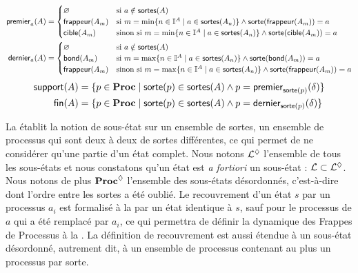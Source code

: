 \begin{definition}
  \begin{align*}
    \mathsf{premier}_{a}(A) &=
      \begin{cases}
        \varnothing & \text{si } a \notin \mathsf{sortes}(A) \\
        \mathsf{frappeur}(A_m) & \text{si } m = \min\{ n \in \mathbb{I}^{A} \mid a \in \mathsf{sortes}(A_n) \}
          \wedge \mathsf{sorte}(\mathsf{frappeur}(A_m)) = a \\
        \mathsf{cible}(A_m) & \text{sinon si } m = \min\{ n \in \mathbb{I}^{A} \mid a \in \mathsf{sortes}(A_n) \}
          \wedge \mathsf{sorte}(\mathsf{cible}(A_m)) = a
      \end{cases} \\
    \mathsf{dernier}_{a}(A) &=
      \begin{cases}
        \varnothing & \text{si } a \notin \mathsf{sortes}(A) \\
        \mathsf{bond}(A_m) & \text{si } m = \max\{ n \in \mathbb{I}^{A} \mid a \in \mathsf{sortes}(A_n) \}
          \wedge \mathsf{sorte}(\mathsf{bond}(A_m)) = a \\
        \mathsf{frappeur}(A_m) & \text{sinon si } m = \max\{ n \in \mathbb{I}^{A} \mid a \in \mathsf{sortes}(A_n) \}
          \wedge \mathsf{sorte}(\mathsf{frappeur}(A_m)) = a
      \end{cases}
  \end{align*}
  \begin{align*}
    \mathsf{support}(A) &= \{ p \in \mathbf{Proc} \mid \mathsf{sorte}(p) \in \mathsf{sortes}(A) \wedge
      p = \mathsf{premier}_{\mathsf{sorte}(p)}(\delta) \} \\
    \mathsf{fin}(A) &= \{ p \in \mathbf{Proc} \mid \mathsf{sorte}(p) \in \mathsf{sortes}(A) \wedge
      p = \mathsf{dernier}_{\mathsf{sorte}(p)}(\delta) \}
  \end{align*}
\end{definition}

La  établit la notion de sous-état sur un ensemble de sortes,
\cad un ensemble de processus qui sont deux à deux de sortes différentes,
ce qui permet de ne considérer qu'une partie d'un état complet.
Nous notons $\mathcal{L}^\lozenge$ l'ensemble de tous les sous-états et nous constatons qu'un
état est \textit{a fortiori} un sous-état : $\mathcal{L} \subset \mathcal{L}^\lozenge$.
Nous notons de plus $\mathbf{Proc}^{\lozenge}$ l'ensemble des sous-états désordonnés,
c'est-à-dire dont l'ordre entre les sortes a été oublié.
Le recouvrement d'un état $s$ par un processus $a_i$ est formalisé à la 
par un état identique à $s$, sauf pour le processus de $a$ qui a été remplacé par $a_i$,
ce qui permettra de définir la dynamique des Frappes de Processus %
à la .
La définition de recouvrement est aussi étendue à un sous-état désordonné,
autrement dit, à un ensemble de processus contenant au plus un processus par sorte.

